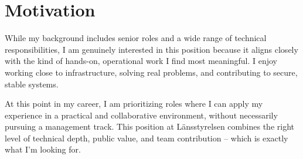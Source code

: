 \section*{Motivation}

While my background includes senior roles and a wide range of technical responsibilities, I am genuinely interested in this position because it aligns closely with the kind of hands-on, operational work I find most meaningful. I enjoy working close to infrastructure, solving real problems, and contributing to secure, stable systems. 

At this point in my career, I am prioritizing roles where I can apply my experience in a practical and collaborative environment, without necessarily pursuing a management track. This position at Länsstyrelsen combines the right level of technical depth, public value, and team contribution – which is exactly what I’m looking for.
